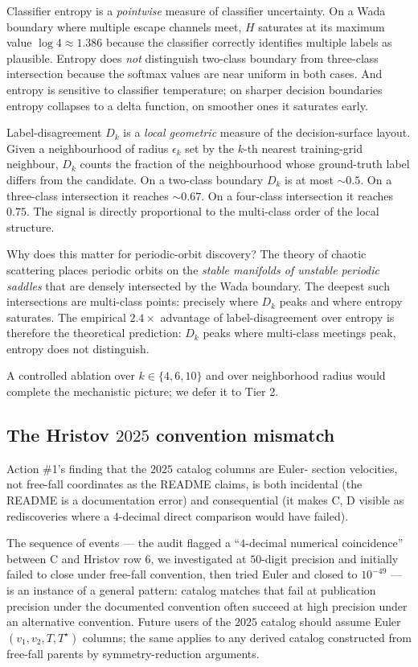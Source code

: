 \documentclass[11pt]{article}
\newcommand{\Tstar}{T^{\star}}
\begin{document}
Classifier entropy is a \emph{pointwise} measure of classifier
uncertainty. On a Wada boundary where multiple escape channels
meet, $H$ saturates at its maximum value $\log 4 \approx 1.386$
because the classifier correctly identifies multiple labels as
plausible. Entropy does \emph{not} distinguish two-class boundary
from three-class intersection because the softmax values are near
uniform in both cases. And entropy is sensitive to classifier
temperature; on sharper decision boundaries entropy collapses to a
delta function, on smoother ones it saturates early.

Label-disagreement $D_k$ is a \emph{local geometric} measure of the
decision-surface layout. Given a neighbourhood of radius
$\epsilon_k$ set by the $k$-th nearest training-grid neighbour, $D_k$
counts the fraction of the neighbourhood whose ground-truth label
differs from the candidate. On a two-class boundary $D_k$ is at most
$\sim 0.5$. On a three-class intersection it reaches $\sim 0.67$. On
a four-class intersection it reaches $0.75$. The signal is
directly proportional to the multi-class order of the local
structure.

Why does this matter for periodic-orbit discovery? The theory of
chaotic scattering \citep{GOY1983, MGOY1985, NusseYorke1992, Poon1996}
places periodic orbits on the \emph{stable manifolds of unstable
periodic saddles} that are densely intersected by the Wada
boundary. The deepest such intersections are multi-class points:
precisely where $D_k$ peaks and where entropy saturates. The
empirical $2.4\times$ advantage of label-disagreement over entropy
is therefore the theoretical prediction: $D_k$ peaks where
multi-class meetings peak, entropy does not distinguish.

A controlled ablation over $k \in \{4, 6, 10\}$ and over
neighborhood radius would complete the mechanistic picture; we
defer it to Tier 2.

\subsection{The Hristov $2025$ convention mismatch}

Action \#1's finding that the $2025$ catalog columns are Euler-
section velocities, not free-fall coordinates as the README claims,
is both incidental (the README is a documentation error) and
consequential (it makes C, D visible as rediscoveries where a
$4$-decimal direct comparison would have failed).

The sequence of events --- the audit flagged a ``$4$-decimal numerical
coincidence'' between C and Hristov row $6$, we investigated at
$50$-digit precision and initially failed to close under free-fall
convention, then tried Euler and closed to $10^{-49}$ --- is an
instance of a general pattern: catalog matches that fail at
publication precision under the documented convention often
succeed at high precision under an alternative convention. Future
users of the $2025$ catalog should assume Euler $(v_1, v_2, T, \Tstar)$
columns; the same applies to any derived catalog constructed from
free-fall parents by symmetry-reduction arguments.
\end{document}
